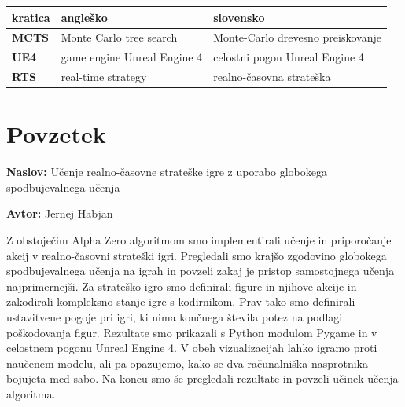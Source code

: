 \documentclass[a4paper, 12pt]{book}
\newcommand{\ttitle}{Učenje realno-časovne strateške igre z uporabo globokega spodbujevalnega učenja}
\newcommand{\tauthor}{Jernej Habjan}
\newcommand{\clearemptydoublepage}{\newpage{\pagestyle{empty}\cleardoublepage}}
\begin{document}

\noindent\begin{tabular}{p{}|p{}|p{}}    %
  {\bf kratica} & {\bf angleško}                             & {\bf slovensko} \\ \hline
   {\bf MCTS}      & Monte Carlo tree search               & Monte-Carlo drevesno preiskovanje \\
  {\bf UE4} & game engine Unreal Engine 4 & celostni pogon Unreal Engine 4 \\
  {\bf RTS} & real-time strategy & realno-časovna strateška \\
\end{tabular}


\clearemptydoublepage

\chapter*{Povzetek}

\noindent\textbf{Naslov:} \ttitle
\bigskip

\noindent\textbf{Avtor:} \tauthor
\bigskip

\noindent 
Z obstoječim Alpha Zero algoritmom smo implementirali učenje in priporočanje akcij v realno-časovni strateški igri.
Pregledali smo krajšo zgodovino globokega spodbujevalnega učenja na igrah in povzeli zakaj je pristop samostojnega učenja najprimernejši.
Za strateško igro smo definirali figure in njihove akcije in zakodirali kompleksno stanje igre s kodirnikom.
Prav tako smo definirali ustavitvene pogoje pri igri, ki nima končnega števila potez na podlagi poškodovanja figur.
Rezultate smo prikazali s Python modulom Pygame in v celostnem pogonu Unreal Engine 4. 
V obeh vizualizacijah lahko igramo proti naučenem modelu, ali pa opazujemo, kako se dva računalniška nasprotnika bojujeta med sabo.
Na koncu smo še pregledali rezultate in povzeli učinek učenja algoritma.
\bigskip
\end{document}
